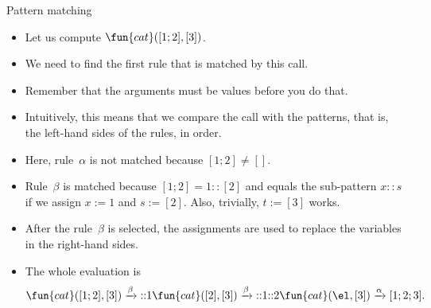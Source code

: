 %
\begin{frame}{Pattern matching}

  \begin{itemize}

    \item Let us compute \(\fun{cat}([1;2],[3])\).

    \item We need to find the first rule that is matched by this call.

    \item Remember that the arguments must be values before you do
      that.

    \item Intuitively, this means that we compare the call with the
      patterns, that is, the left\hyp{}hand sides of the rules, in
      order.

    \item Here, rule~\(\alpha\) is not matched because \([1;2] \neq
      []\).

    \item Rule~\(\beta\) is matched because \([1;2] = 1::[2]\) and
      equals the sub\hyp{}pattern \(x::s\) if we assign \(x := 1\) and
      \(s := [2]\). Also, trivially, \(t := [3]\) works.

    \item After the rule~\(\beta\) is selected, the assignments are
      used to replace the variables in the right\hyp{}hand sides.

    \item The whole evaluation is
    \begin{equation*}
      \fun{cat}([1;2],[3])
      \xrightarrow{\beta}
      \cons{1}{\fun{cat}([2],[3])}
      \xrightarrow{\beta}
      \cons{1}{\cons{2}{\fun{cat}(\el,[3])}}
      \xrightarrow{\alpha}
                    [1;2;3].
    \end{equation*}
  \end{itemize}

\end{frame}
